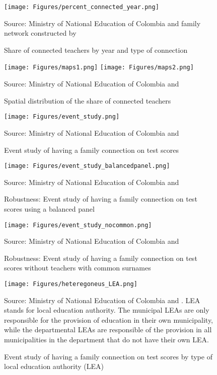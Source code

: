 \documentclass[12pt,runningheads]{article}
\newcommand\fnote[1]{\captionsetup{font=small}\caption*{#1}}
\begin{document}
\begin{figure}[h]
   \caption{Share of connected teachers by year and type of connection}
   \label{fig:shareconnected}
    \centering
    \texttt{[image: Figures/percent\_connected\_year.png]}
    \fnote{Source: Ministry of National Education of Colombia and family network constructed by \cite{Riano2021}}
\end{figure}

\begin{figure}[H]
   \caption{Spatial distribution of the share of connected teachers}
   \label{fig:map}
    \centering
    \texttt{[image: Figures/maps1.png]}
    \texttt{[image: Figures/maps2.png]}
    \fnote{Source: Ministry of National Education of Colombia and \cite{Riano2021}}
\end{figure}

\begin{figure}[H]
   \caption{Event study of having a family connection on test scores}
   \label{fig:event_study}
    \centering
    \texttt{[image: Figures/event\_study.png]}
    \fnote{Source: Ministry of National Education of Colombia and \cite{Riano2021}}
\end{figure}

\begin{figure}[H]
   \caption{Robustness: Event study of having a family connection on test scores using a balanced panel}
   \label{fig:event_study_sample}
    \centering
    \texttt{[image: Figures/event\_study\_balancedpanel.png]}
    \fnote{Source: Ministry of National Education of Colombia and \cite{Riano2021}}
\end{figure}

\begin{figure}[H]
   \caption{Robustness: Event study of having a family connection on test scores without teachers with common surnames}
   \label{fig:event_study_nocommon}
    \centering
    \texttt{[image: Figures/event\_study\_nocommon.png]}
    \fnote{Source: Ministry of National Education of Colombia and \cite{Riano2021}}
\end{figure}

\begin{figure}[H]
   \caption{Event study of having a family connection on test scores by type of local education authority (LEA)}
   \label{fig:event_study_LEA}
    \centering
    \texttt{[image: Figures/heteregoneus\_LEA.png]}
    \fnote{Source: Ministry of National Education of Colombia and \cite{Riano2021}. 
    LEA stands for local education authority. The municipal LEAs are only responsible for the provision of education in their own municipality, while the departmental LEAs are responsible of the provision in all municipalities in the department that do not have their own LEA.}
\end{figure}
\end{document}
